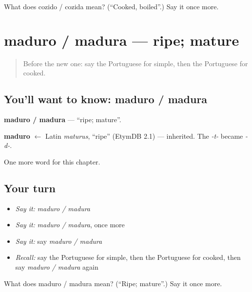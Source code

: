 \begin{tcolorbox}[breakable,colback=teal!4,colframe=teal!35!black,title={Before you move on}]
What does cozido / cozida mean? (\textquotedblleft{}Cooked, boiled\textquotedblright{}.) Say it once more.
\end{tcolorbox}
\section[maduro / madura]{maduro / madura — ripe; mature}

\label{lesson:PT-C242-maduro-madura}



\begin{quote}
Before the new one: say the Portuguese for simple, then the Portuguese for cooked.
\end{quote}

\subsection*{You'll want to know: maduro / madura}
\textbf{maduro / madura} — \textquotedblleft{}ripe; mature\textquotedblright{}.

\begin{cousinweb}
\textbf{maduro} $\leftarrow$ Latin \emph{maturus}, \textquotedblleft{}ripe\textquotedblright{} (EtymDB 2.1) — inherited. The \emph{-t-} became \emph{-d-}.
\end{cousinweb}

\begin{grammarlens}[title={What you've built}]
One more word for this chapter.
\end{grammarlens}

\subsection*{Your turn}
\begin{itemize}
\raggedright
  \item \emph{Say it:} \emph{maduro / madura}
  \item \emph{Say it:} \emph{maduro / madura}, once more
  \item \emph{Say it:} say \emph{maduro / madura}
  \item \emph{Recall:} say the Portuguese for simple, then the Portuguese for cooked, then say \emph{maduro / madura} again
\end{itemize}

\begin{tcolorbox}[breakable,colback=teal!4,colframe=teal!35!black,title={Before you move on}]
What does maduro / madura mean? (\textquotedblleft{}Ripe; mature\textquotedblright{}.) Say it once more.
\end{tcolorbox}

